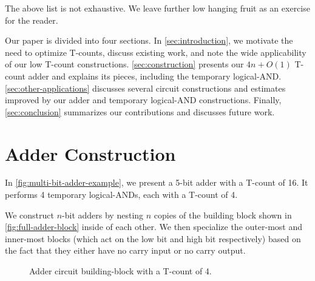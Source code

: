 \documentclass[twocolumn]{revtex4-1}
\begin{document}
The above list is not exhaustive.
We leave further low hanging fruit as an exercise for the reader.

Our paper is divided into four sections.
In \autoref{sec:introduction}, we motivate the need to optimize T-counts, discuss existing work, and note the wide applicability of our low T-count constructions.
\autoref{sec:construction} presents our $4n + O(1)$ T-count adder and explains its pieces, including the temporary logical-AND.
\autoref{sec:other-applications} discusses several circuit constructions and estimates improved by our adder and temporary logical-AND constructions.
Finally, \autoref{sec:conclusion} summarizes our contributions and discusses future work.


\section{Adder Construction}
\label{sec:construction}

In \autoref{fig:multi-bit-adder-example}, we present a 5-bit adder with a T-count of 16.
It performs 4 temporary logical-ANDs, each with a T-count of 4.

We construct $n$-bit adders by nesting $n$ copies of the building block shown in \autoref{fig:full-adder-block} inside of each other.
We then specialize the outer-most and inner-most blocks (which act on the low bit and high bit respectively) based on the fact that they either have no carry input or no carry output.

\begin{figure}
  \caption{
	Adder circuit building-block with a T-count of 4.
  }
  \label{fig:full-adder-block}
\end{figure}
\end{document}
